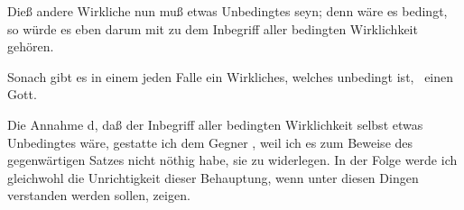 \begin{aufza}
\begin{aufzb}
\item Dieß andere Wirkliche nun muß etwas Unbedingtes seyn; denn wäre es bedingt, so würde es eben darum mit zu dem Inbegriff aller bedingten Wirklichkeit gehören.
\item Sonach gibt es in einem jeden Falle ein Wirkliches, welches unbedingt ist, \dh\ einen Gott.
\end{aufzb}
\begin{RWanm}
Die Annahme d, daß der Inbegriff aller bedingten Wirklichkeit selbst etwas Unbedingtes wäre, gestatte ich dem Gegner , weil ich es zum Beweise des gegenwärtigen Satzes nicht nöthig habe, sie zu widerlegen. In der Folge werde ich gleichwohl die Unrichtigkeit dieser Behauptung, wenn unter diesen Dingen  verstanden werden sollen, zeigen.
\end{RWanm}
\end{aufza}

